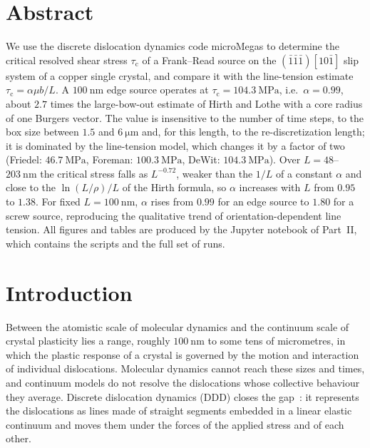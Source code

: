 \documentclass[11pt,a4paper]{article}
\numberwithin{equation}{section}
\theoremstyle{remark}
\newcommand{\tauc}{\tau_{\mathrm{c}}}
\begin{document}
\section*{Abstract}
  We use the discrete dislocation dynamics code microMegas to determine the critical resolved shear
  stress $\tauc$ of a Frank--Read source on the $(\bar1\bar1\bar1)[10\bar1]$ slip system of a copper
  single crystal, and compare it with the line-tension estimate $\tauc = \alpha\mu b/L$. A
  $\SI{100}{\nano\metre}$ edge source operates at $\tauc = \SI{104.3}{\mega\pascal}$, i.e.\
  $\alpha = 0.99$, about $2.7$ times the large-bow-out estimate of Hirth and Lothe with a core radius of
  one Burgers vector. The value is insensitive to the number of time steps, to the box size between
  $1.5$ and $\SI{6}{\micro\metre}$ and, for this length, to the re-discretization length; it is
  dominated by the line-tension model, which changes it by a factor of two (Friedel:
  $\SI{46.7}{\mega\pascal}$, Foreman: $\SI{100.3}{\mega\pascal}$, DeWit: $\SI{104.3}{\mega\pascal}$). Over
  $L = 48$--$\SI{203}{\nano\metre}$ the critical stress falls as $L^{-0.72}$, weaker than the $1/L$ of a
  constant $\alpha$ and close to the $\ln(L/\rho)/L$ of the Hirth formula, so $\alpha$ increases with
  $L$ from $0.95$ to $1.38$. For fixed $L = \SI{100}{\nano\metre}$, $\alpha$ rises from $0.99$ for an edge
  source to $1.80$ for a screw source, reproducing the qualitative trend of orientation-dependent line
  tension. All figures and tables are produced by the Jupyter notebook of Part~II, which contains the
  scripts and the full set of runs.

\tableofcontents
\clearpage

\section{Introduction}\label{sec:intro}

Between the atomistic scale of molecular dynamics and the continuum scale of crystal plasticity lies
a range, roughly $\SI{100}{\nano\metre}$ to some tens of micrometres, in which the plastic response of a
crystal is governed by the motion and interaction of individual dislocations. Molecular dynamics cannot
reach these sizes and times, and continuum models do not resolve the dislocations whose collective
behaviour they average. Discrete dislocation dynamics (DDD) closes the gap~\citep{script3, fivel2008}:
it represents the dislocations as lines made of straight segments embedded in a linear elastic
continuum and moves them under the forces of the applied stress and of each other.
\end{document}
